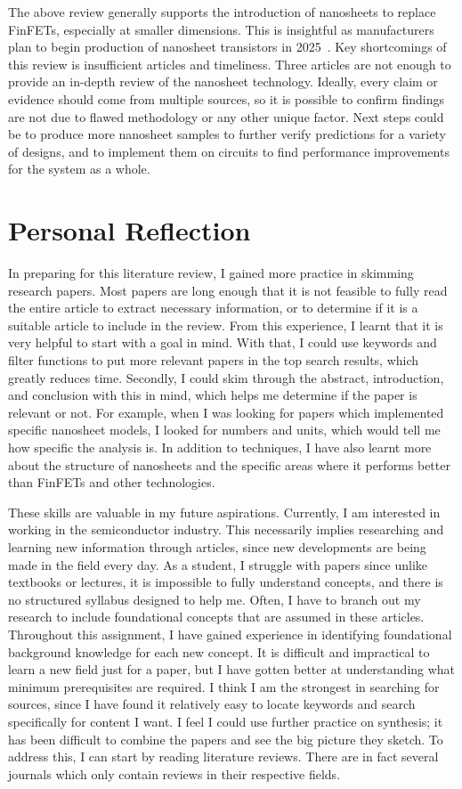 \documentclass[12pt]{article}
\begin{document}
The above review generally supports the introduction of nanosheets to replace FinFETs, especially at smaller dimensions. This is insightful as manufacturers plan to begin production of nanosheet transistors in 2025~\cite{tsmc}. Key shortcomings of this review is insufficient articles and timeliness. Three articles are not enough to provide an in-depth review of the nanosheet technology. Ideally, every claim or evidence should come from multiple sources, so it is possible to confirm findings are not due to flawed methodology or any other unique factor. Next steps could be to produce more nanosheet samples to further verify predictions for a variety of designs, and to implement them on circuits to find performance improvements for the system as a whole.

\section{Personal Reflection}

In preparing for this literature review, I gained more practice in skimming research papers. Most papers are long enough that it is not feasible to fully read the entire article to extract necessary information, or to determine if it is a suitable article to include in the review. From this experience, I learnt that it is very helpful to start with a goal in mind. With that, I could use keywords and filter functions to put more relevant papers in the top search results, which greatly reduces time. Secondly, I could skim through the abstract, introduction, and conclusion with this in mind, which helps me determine if the paper is relevant or not. For example, when I was looking for papers which implemented specific nanosheet models, I looked for numbers and units, which would tell me how specific the analysis is. In addition to techniques, I have also learnt more about the structure of nanosheets and the specific areas where it performs better than FinFETs and other technologies.

These skills are valuable in my future aspirations. Currently, I am interested in working in the semiconductor industry. This necessarily implies researching and learning new information through articles, since new developments are being made in the field every day. As a student, I struggle with papers since unlike textbooks or lectures, it is impossible to fully understand concepts, and there is no structured syllabus designed to help me. Often, I have to branch out my research to include foundational concepts that are assumed in these articles. Throughout this assignment, I have gained experience in identifying foundational background knowledge for each new concept. It is difficult and impractical to learn a new field just for a paper, but I have gotten better at understanding what minimum prerequisites are required. I think I am the strongest in searching for sources, since I have found it relatively easy to locate keywords and search specifically for content I want. I feel I could use further practice on synthesis; it has been difficult to combine the papers and see the big picture they sketch. To address this, I can start by reading literature reviews. There are in fact several journals which only contain reviews in their respective fields.



\end{document}
